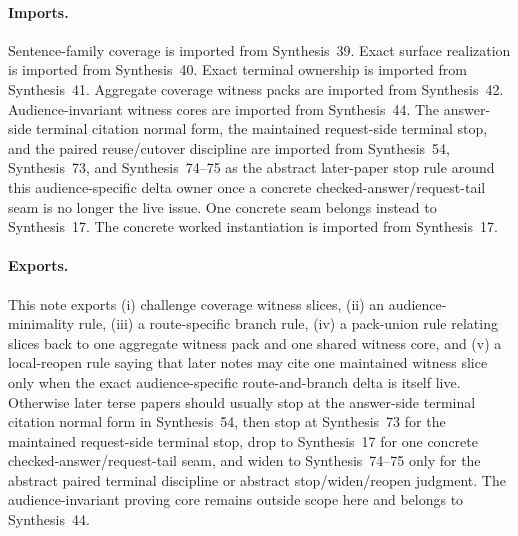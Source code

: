 \documentclass[11pt]{article}
\begin{document}
\paragraph{Imports.}
Sentence-family coverage is imported from Synthesis~39.\cite{series:challengecoverage}
Exact surface realization is imported from Synthesis~40.\cite{series:challengesurfacehooks}
Exact terminal ownership is imported from Synthesis~41.\cite{series:challengeterminalwitnesses}
Aggregate coverage witness packs are imported from Synthesis~42.\cite{series:challengecoveragewitnesspacks}
Audience-invariant witness cores are imported from Synthesis~44.\cite{series:challengecoveragewitnesscores}
The answer-side terminal citation normal form, the maintained request-side terminal stop, and the paired reuse/cutover discipline are imported from Synthesis~54, Synthesis~73, and Synthesis~74--75 as the abstract later-paper stop rule around this audience-specific delta owner once a concrete checked-answer/request-tail seam is no longer the live issue. One concrete seam belongs instead to Synthesis~17.\cite{series:challengeanswerreviewmenus,series:publicrequestresponsepacketrefreshresponsepacketclosureverdicts,series:pairedterminalcitationdiscipline,series:pairedterminalcutoverrules,series:workedexample}
The concrete worked instantiation is imported from Synthesis~17.\cite{series:workedexample}
\paragraph{Exports.}
This note exports (i) challenge coverage witness slices, (ii) an audience-minimality rule, (iii) a route-specific branch rule, (iv) a pack-union rule relating slices back to one aggregate witness pack and one shared witness core, and (v) a local-reopen rule saying that later notes may cite one maintained witness slice only when the exact audience-specific route-and-branch delta is itself live.
Otherwise later terse papers should usually stop at the answer-side terminal citation normal form in Synthesis~54, then stop at Synthesis~73 for the maintained request-side terminal stop, drop to Synthesis~17 for one concrete checked-answer/request-tail seam, and widen to Synthesis~74--75 only for the abstract paired terminal discipline or abstract stop/widen/reopen judgment. The audience-invariant proving core remains outside scope here and belongs to Synthesis~44.\cite{series:challengecoveragewitnesscores,series:challengeanswerreviewmenus,series:publicrequestresponsepacketrefreshresponsepacketclosureverdicts,series:pairedterminalcitationdiscipline,series:pairedterminalcutoverrules,series:workedexample}
\end{document}
